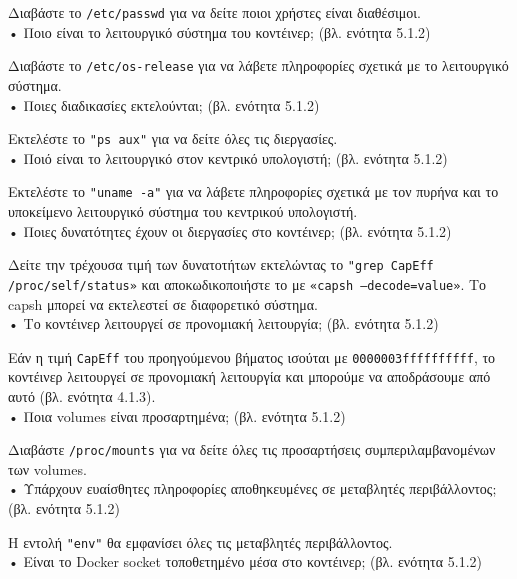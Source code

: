Διαβάστε το \texttt{\textlatin{/etc/passwd}} για να δείτε ποιοι χρήστες είναι
διαθέσιμοι. \\

• Ποιο είναι το λειτουργικό σύστημα του κοντέινερ; (βλ. ενότητα 5.1.2)

Διαβάστε το \texttt{\textlatin{/etc/os-release}} για να λάβετε πληροφορίες
σχετικά με το λειτουργικό σύστημα. \\

• Ποιες διαδικασίες εκτελούνται; (βλ. ενότητα 5.1.2)

Εκτελέστε το \texttt{\textlatin{"ps aux"}} για να δείτε όλες τις διεργασίες. \\

• Ποιό είναι το λειτουργικό στον κεντρικό υπολογιστή; (βλ. ενότητα 5.1.2)

Εκτελέστε το \texttt{\textlatin{"uname -a"}} για να λάβετε πληροφορίες σχετικά
με τον πυρήνα και το υποκείμενο λειτουργικό σύστημα του κεντρικού υπολογιστή. \\

• Ποιες δυνατότητες έχουν οι διεργασίες στο κοντέινερ; (βλ. ενότητα 5.1.2)

Δείτε την τρέχουσα τιμή των δυνατοτήτων εκτελώντας το
\texttt{\textlatin{"grep CapEff /proc/self/status»}} και αποκωδικοποιήστε το με
\texttt{\textlatin{«capsh --decode=value»}}. Το \textlatin{capsh}
μπορεί να εκτελεστεί σε διαφορετικό σύστημα. \\

• Το κοντέινερ λειτουργεί σε προνομιακή λειτουργία; (βλ. ενότητα 5.1.2)

Εάν η τιμή \texttt{\textlatin{CapEff}} του προηγούμενου βήματος ισούται με
\texttt{\textlatin{0000003ffffffffff}}, το κοντέινερ λειτουργεί σε προνομιακή
λειτουργία και μπορούμε να αποδράσουμε από αυτό (βλ. ενότητα 4.1.3). \\

• Ποια \textlatin{volumes} είναι προσαρτημένα; (βλ. ενότητα 5.1.2)

Διαβάστε \texttt{\textlatin{/proc/mounts}} για να δείτε όλες τις προσαρτήσεις
συμπεριλαμβανομένων των \textlatin{volumes}. \\

• Υπάρχουν ευαίσθητες πληροφορίες αποθηκευμένες σε μεταβλητές περιβάλλοντος;
(βλ. ενότητα 5.1.2)

Η εντολή \texttt{\textlatin{"env"}} θα εμφανίσει όλες τις μεταβλητές
περιβάλλοντος. \\


• Είναι το \textlatin{Docker socket} τοποθετημένο μέσα στο κοντέινερ;
(βλ. ενότητα 5.1.2)

